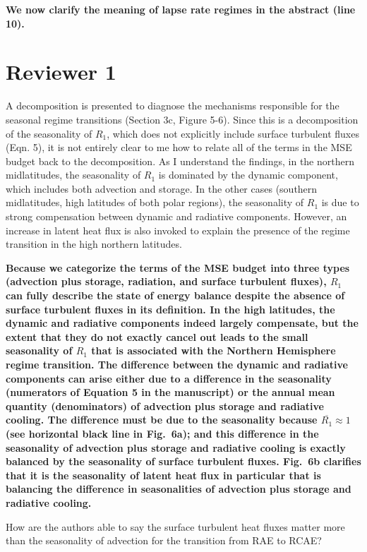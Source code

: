 \documentclass{article}
\begin{document}
\textbf{We now clarify the meaning of lapse rate regimes in the abstract (line 10).}

\section*{Reviewer 1}
A decomposition is presented to diagnose the mechanisms responsible for the seasonal regime transitions (Section 3c, Figure 5-6). Since this is a decomposition of the seasonality of $R_1$, which does not explicitly include surface turbulent fluxes (Eqn. 5), it is not entirely clear to me how to relate all of the terms in the MSE budget back to the decomposition. As I understand the findings, in the northern midlatitudes, the seasonality of $R_1$ is dominated by the dynamic component, which includes both advection and storage. In the other cases (southern midlatitudes, high latitudes of both polar regions), the seasonality of $R_1$ is due to strong compensation between dynamic and radiative components. However, an increase in latent heat flux is also invoked to explain the presence of the regime transition in the high northern latitudes.

\textbf{Because we categorize the terms of the MSE budget into three types (advection plus storage, radiation, and surface turbulent fluxes), $R_1$ can fully describe the state of energy balance despite the absence of surface turbulent fluxes in its definition. In the high latitudes, the dynamic and radiative components indeed largely compensate, but the extent that they do not exactly cancel out leads to the small seasonality of $R_1$ that is associated with the Northern Hemisphere regime transition. The difference between the dynamic and radiative components can arise either due to a difference in the seasonality (numerators of Equation 5 in the manuscript) or the annual mean quantity (denominators) of advection plus storage and radiative cooling. The difference must be due to the seasonality because $\overline{R_1}\approx 1$ (see horizontal black line in Fig.~6a); and this difference in the seasonality of advection plus storage and radiative cooling is exactly balanced by the seasonality of surface turbulent fluxes. Fig.~6b clarifies that it is the seasonality of latent heat flux in particular that is balancing the difference in seasonalities of advection plus storage and radiative cooling.}

How are the authors able to say the surface turbulent heat fluxes matter more than the seasonality of advection for the transition from RAE to RCAE?
\end{document}
